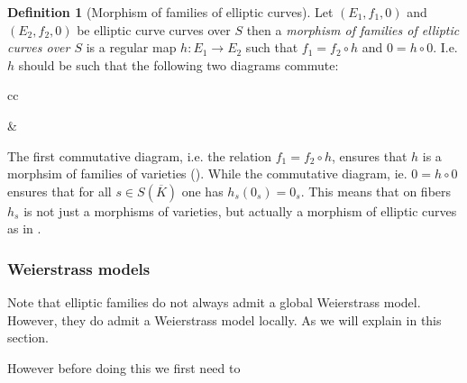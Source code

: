\documentclass[a4paper,12pt,reqno]{amsart}
\theoremstyle{definition}
\newtheorem{definition}[lemma]{Definition}
\numberwithin{lemma}{section}
\numberwithin{equation}{section}
\numberwithin{figure}{section}
\begin{document}
\begin{definition}[Morphism of families of elliptic curves]
Let $(E_1,f_1,0)$ and $(E_2,f_2,0)$ be elliptic curve curves over $S$ then a \textit{morphism of families of elliptic curves over $S$} is a regular map $h : E_1 \to E_2$ such that $f_1 = f_2\circ h$ and $0 = h \circ 0$.
I.e. $h$ should be such that the following two diagrams commute:
\begin{center}


\begin{tabular}{cc}	
	&
\end{tabular}
\end{center}

The first commutative diagram, i.e. the relation $f_1 = f_2\circ h$, ensures that $h$ is a morphsim of families of varieties (). While the commutative diagram, ie. $0 = h \circ 0$ ensures that for all $s \in S(\overline K)$ one has $h_s(0_s) = 0_s$.  This means that on fibers $h_s$ is not just a morphisms of varieties, but actually a morphism of elliptic curves as in .

\end{definition}

\subsubsection{Weierstrass models}

Note that elliptic families do not always admit a global Weierstrass model. However, they do admit a Weierstrass model locally. As we will explain in this section.

However before doing this we first need to
\end{document}
